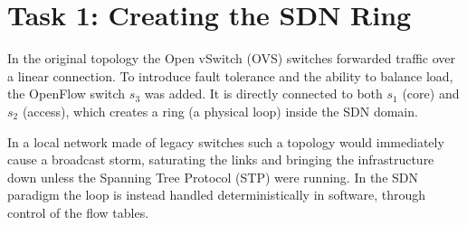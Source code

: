 \documentclass[11pt,a4paper]{article}
\begin{document}
\section{Task 1: Creating the SDN Ring}
In the original topology the Open vSwitch (OVS) switches forwarded traffic over
a linear connection. To introduce fault tolerance and the ability to balance
load, the OpenFlow switch $s_3$ was added. It is directly connected to both
$s_1$ (core) and $s_2$ (access), which creates a ring (a physical loop) inside
the SDN domain.

In a local network made of legacy switches such a topology would immediately
cause a broadcast storm, saturating the links and bringing the infrastructure
down unless the Spanning Tree Protocol (STP) were running. In the SDN paradigm
the loop is instead handled deterministically in software, through control of
the flow tables.
\end{document}
